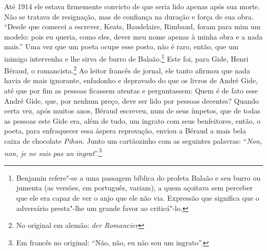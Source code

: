 Até 1914 ele estava firmemente convicto de que seria lido apenas após
sua morte. Não se tratava de resignação, mas de confiança na duração e
força de sua obra. ``Desde que comecei a escrever, Keats, Baudelaire,
Rimbaud, foram para mim um modelo: pois eu queria, como eles, dever meu
nome apenas à minha obra e a nada mais.'' Uma vez que um poeta ocupe
esse posto, não é raro, então, que um inimigo intervenha e lhe sirva de
burro de Balaão.\footnote{Benjamin refere"-se a uma passagem bíblica do profeta Balaão e seu burro ou jumenta (as versões, em português, variam), a quem açoitava sem perceber que ele era capaz de ver o anjo que ele não via. Expressão que significa que o adversário
  presta"-lhe um grande favor ao criticá"-lo. \versal{[N.~T.]}} Este foi, para Gide, Henri Béraud, o romancista.\footnote{No original em alemão: \emph{der Romancier} \versal{[N.~T.]}} Ao leitor francês de jornal, ele tanto afirmou que nada
havia de mais ignorante, enfadonho e depravado do que os livros de André
Gide, até que por fim as pessoas ficassem atentas e perguntassem: Quem é
de fato esse André Gide, que, por nenhum preço, deve ser lido por
pessoas decentes? Quando certa vez, após muitos anos, Béraud escreveu,
num de seus ímpetos, que de todas as pessoas este Gide era, além de
tudo, um ingrato com seus benfeitores, então, o poeta, para enfraquecer
essa áspera reprovação, enviou a Béraud a mais bela caixa de chocolate
\emph{Pihan.} Junto um cartãozinho com as seguintes palavras:
``\emph{Non, non, je ne suis pas un ingrat}''.\footnote{Em francês no original: ``Não,
  não, eu não sou um ingrato''. \versal{[N.~T.]}}

